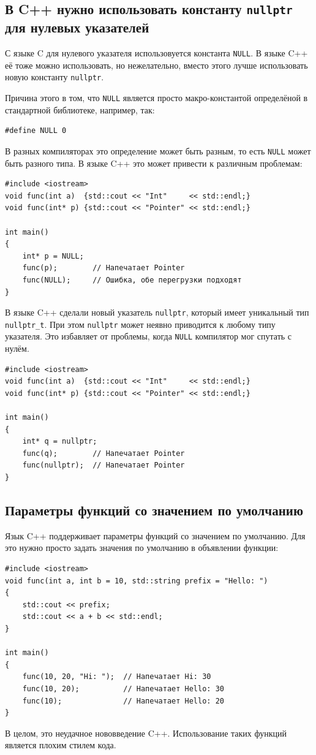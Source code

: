 \documentclass{article}
\begin{document}
\subsection*{В C++ нужно использовать константу \texttt{nullptr} для нулевых указателей}
С языке C для нулевого указателя использовуется константа \texttt{NULL}. В языке C++ её тоже можно использовать, но нежелательно, вместо этого лучше использовать новую константу \texttt{nullptr}.

Причина этого в том, что \texttt{NULL} является просто макро-константой определёной в стандартной библиотеке, например, так:
\begin{lstlisting}
#define NULL 0
\end{lstlisting}
В разных компиляторах это определение может быть разным, то есть \texttt{NULL} может быть разного типа.
В языке C++ это может привести к различным проблемам:
\begin{lstlisting}
#include <iostream>
void func(int a)  {std::cout << "Int"     << std::endl;}
void func(int* p) {std::cout << "Pointer" << std::endl;}

int main()
{
    int* p = NULL;
    func(p);        // Напечатает Pointer
    func(NULL);     // Ошибка, обе перегрузки подходят
}
\end{lstlisting}
В языке C++ сделали новый указатель \texttt{nullptr}, который имеет уникальный тип \texttt{nullptr\_t}. При этом \texttt{nullptr} может неявно приводится к любому типу указателя. Это избавляет от проблемы, когда \texttt{NULL} компилятор мог спутать с нулём.
\begin{lstlisting}
#include <iostream>
void func(int a)  {std::cout << "Int"     << std::endl;}
void func(int* p) {std::cout << "Pointer" << std::endl;}

int main()
{
    int* q = nullptr;
    func(q);        // Напечатает Pointer
    func(nullptr);  // Напечатает Pointer
}
\end{lstlisting}

\subsection*{Параметры функций со значением по умолчанию}
Язык C++ поддерживает параметры функций со значением по умолчанию. Для это нужно просто задать значения по умолчанию в объявлении функции:
\begin{lstlisting}
#include <iostream>
void func(int a, int b = 10, std::string prefix = "Hello: ")
{
    std::cout << prefix;
    std::cout << a + b << std::endl;
}

int main()
{
    func(10, 20, "Hi: ");  // Напечатает Hi: 30
    func(10, 20);          // Напечатает Hello: 30
    func(10);              // Напечатает Hello: 20
}
\end{lstlisting}
В целом, это неудачное нововведение C++. Использование таких функций является плохим стилем кода. 
\end{document}
